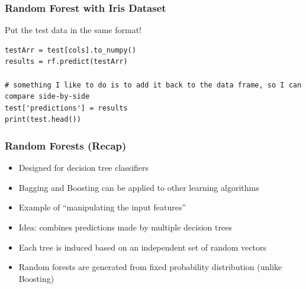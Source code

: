 \begin{frame}[fragile]\frametitle{Random Forest with Iris Dataset}
Put the test data in the same format!
\begin{lstlisting}
testArr = test[cols].to_numpy()
results = rf.predict(testArr)

# something I like to do is to add it back to the data frame, so I can compare side-by-side
test['predictions'] = results
print(test.head())
\end{lstlisting}
\end{frame}

\begin{frame}[fragile]\frametitle{Random Forests (Recap)}
\begin{itemize}
\item Designed for decision tree classifiers
\item Bagging and Boosting can be applied to other learning algorithms
\item Example of ``manipulating the input features'' 
\item Idea: combines predictions made by multiple decision trees
\item Each tree is induced based on an independent set of random vectors
\item Random forests are generated from fixed probability distribution (unlike Boosting)

\end{itemize}
\end{frame}